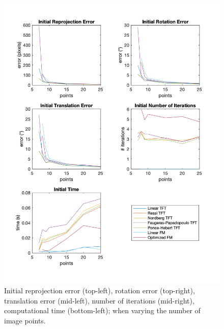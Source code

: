 \begin{figure}[p]
	\centering
	\includegraphics[width=1\textwidth]{Experiments/Synthetic/points/INITpointsPlots.png}
	\caption[Synthetic Trial varying Number of Image Points]{Initial reprojection error (top-left), rotation error (top-right), translation error (mid-left), number of iterations (mid-right), computational time (bottom-left); when varying the number of image points.}
	\label{fig:initPointsPlot}
\end{figure}

